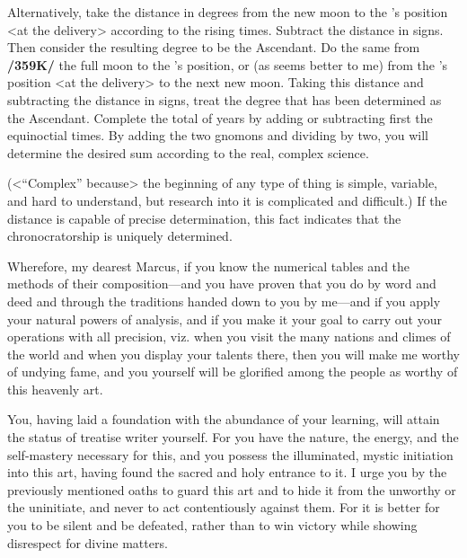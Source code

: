 Alternatively,  take the distance in degrees from the new moon to the \Moon’s position <at the delivery> according to the rising times. Subtract the distance in signs. Then consider the resulting degree
to be the Ascendant. Do the same from \textbf{/359K/} the full moon to the \Moon’s position, or (as seems better to me) from the \Moon’s position <at the delivery> to the next new moon. Taking this distance and subtracting the distance in signs, treat the degree that has been determined as the Ascendant. Complete the total of years by adding or subtracting first the equinoctial times. By adding the two gnomons and
dividing by two, you will determine the desired sum according to the real, complex science.

(<“Complex” because> the beginning of any type of thing is simple, variable, and hard to understand, but research into it is complicated and difficult.) If the distance is capable of precise determination, this fact
indicates that the chronocratorship is uniquely determined. 

Wherefore, my dearest Marcus, if you know the numerical tables and the methods of their composition—and you have proven that you do by word and deed and through the traditions handed down to you by me—and if you apply your natural powers of analysis, and if you make it your goal to carry out your operations with all precision, viz. when you visit the many nations and climes of the world and when you display your talents there, then you will make me worthy of undying fame, and you yourself will be glorified among the people as worthy of this heavenly art. 

You, having laid a foundation with the abundance of your learning, will attain the status of treatise writer yourself. For you have the nature, the energy, and the self-mastery necessary for this, and you possess the illuminated, mystic initiation into this art, having found the sacred and holy entrance to it. I urge you by the previously mentioned oaths to guard this art and to hide it from the unworthy or the uninitiate, and never to act contentiously against them. For it is better for you to be silent and be defeated, rather than to win victory while showing disrespect for divine matters.
\newpage